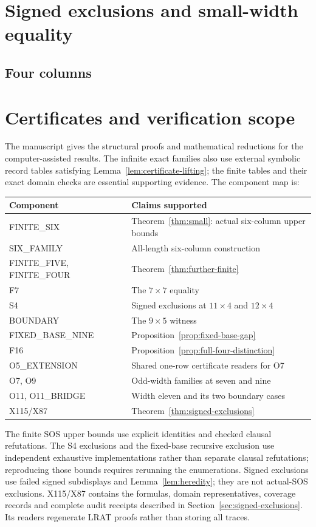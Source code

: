 \documentclass[11pt,a4paper]{article}
\theoremstyle{definition}
\begin{document}
\section{Signed exclusions and small-width equality}\label{sec:signed-small}
\subsection{Four columns}



\appendix
\section{Certificates and verification scope}\label{app:data}
The manuscript gives the structural proofs and mathematical reductions
for the computer-assisted results. The infinite exact families also use
external symbolic record tables satisfying
Lemma~\ref{lem:certificate-lifting}; the finite tables and their exact
domain checks are essential supporting evidence. The component map is:
\begin{center}\small
\begin{tabular}{ll}
\toprule
Component&Claims supported\\\midrule
FINITE\_SIX&Theorem~\ref{thm:small}: actual six-column upper bounds\\
SIX\_FAMILY&All-length six-column construction\\
FINITE\_FIVE, FINITE\_FOUR&Theorem~\ref{thm:further-finite}\\
F7&The $7\times7$ equality\\
S4&Signed exclusions at $11\times4$ and $12\times4$\\
BOUNDARY&The $9\times5$ witness\\
FIXED\_BASE\_NINE&Proposition~\ref{prop:fixed-base-gap}\\
F16&Proposition~\ref{prop:full-four-distinction}\\
O5\_EXTENSION&Shared one-row certificate readers for O7\\
O7, O9&Odd-width families at seven and nine\\
O11, O11\_BRIDGE&Width eleven and its two boundary cases\\
X115/X87&Theorem~\ref{thm:signed-exclusions}\\\bottomrule
\end{tabular}
\end{center}
The finite SOS upper bounds use explicit identities and checked clausal
refutations. The S4 exclusions and the fixed-base recursive exclusion use
independent exhaustive implementations rather than separate clausal
refutations; reproducing those bounds requires rerunning the enumerations. Signed exclusions use failed signed subdisplays and
Lemma~\ref{lem:heredity}; they are not actual-SOS exclusions. X115/X87
contains the formulas, domain representatives, coverage records and
complete audit receipts described in Section~\ref{sec:signed-exclusions}.
Its readers regenerate LRAT proofs rather than storing all traces.
\end{document}
